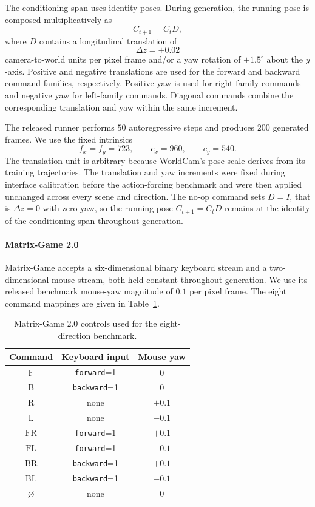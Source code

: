 The conditioning span uses identity poses. During generation, the running pose
is composed multiplicatively as
\[
C_{t+1}=C_tD,
\]
where $D$ contains a longitudinal translation of
\[
\Delta z=\pm0.02
\]
camera-to-world units per pixel frame and/or a yaw rotation of
$\pm1.5^\circ$ about the $y$-axis. Positive and negative translations are used
for the forward and backward command families, respectively. Positive yaw is
used for right-family commands and negative yaw for left-family commands.
Diagonal commands combine the corresponding translation and yaw within the
same increment.

The released runner performs $50$ autoregressive steps and produces $200$
generated frames. We use the fixed intrinsics
\[
f_x=f_y=723,\qquad c_x=960,\qquad c_y=540.
\]
The translation unit is arbitrary because WorldCam's pose scale derives from
its training trajectories. The translation and yaw increments were fixed
during interface calibration before the action-forcing benchmark and were
then applied unchanged across every scene and direction. The no-op command sets $D=I$, that is $\Delta z=0$ with zero yaw, so the
running pose $C_{t+1}=C_tD$ remains at the identity of the conditioning span
throughout generation.

\paragraph{Matrix-Game 2.0}
Matrix-Game accepts a six-dimensional binary keyboard stream and a
two-dimensional mouse stream, both held constant throughout generation. We
use its released benchmark mouse-yaw magnitude of $0.1$ per pixel frame. The
eight command mappings are given in
Table~\ref{tab:matrix_game_commands}.

\begin{table}[t]
\centering
{
\small
\begin{tabular}{ccc}
\toprule
Command & Keyboard input & Mouse yaw \\
\midrule
$\mathrm{F}$  & \texttt{forward}=1  & $0$ \\
$\mathrm{B}$  & \texttt{backward}=1 & $0$ \\
$\mathrm{R}$  & none                & $+0.1$ \\
$\mathrm{L}$  & none                & $-0.1$ \\
$\mathrm{FR}$ & \texttt{forward}=1  & $+0.1$ \\
$\mathrm{FL}$ & \texttt{forward}=1  & $-0.1$ \\
$\mathrm{BR}$ & \texttt{backward}=1 & $+0.1$ \\
$\mathrm{BL}$ & \texttt{backward}=1 & $-0.1$ \\
$\varnothing$ & none                & $0$ \\
\bottomrule
\end{tabular}
}
\caption{
    Matrix-Game 2.0 controls used for the eight-direction benchmark.
}
\label{tab:matrix_game_commands}
\end{table}

